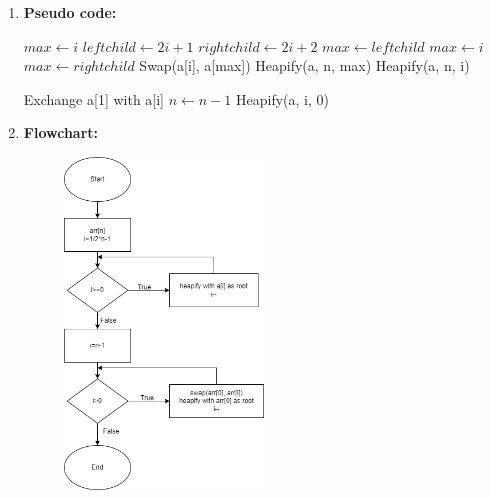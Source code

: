 \documentclass[11pt,a4paper]{article}
\begin{document}
{\begin{enumerate}[label=\textbf{\arabic*})]
					Heapsort is an in-place sorting method, i.e., no additional memory space is required except for loop and auxiliary variables. The number of these variables is always the same. Therefore the space complexity of heapsort is O(1).
				\\[12pt]
				\item \textbf{Pseudo code:} 
				\begin{algorithm}
            	\begin{algorithmic}[1]
            			\State $max \gets i$
            			\State $leftchild \gets 2i+1$
            			\State $rightchild \gets 2i+2$
            				\State $max \gets leftchild$
            			\Else
            				\State $max \gets i$
            			\EndIf
            				\State $max \gets rightchild$
            			\EndIf
            				\State Swap(a[i], a[max])
            				\State Heapify(a, n, max)
            			\EndIf
            		\EndProcedure
            		\vspace{12pt}
            				Heapify(a, n, i)
            			\EndFor
            			
            				\State Exchange a[1] with a[i]
            				\State $n \gets n - 1$
            				\State Heapify(a, i, 0)
            			\EndFor
            		\EndProcedure
            	\end{algorithmic}
            \end{algorithm}
				\item \textbf{Flowchart:}
					\begin{figure}[H]
						\centering 
						\includegraphics[width=0.5\textwidth]{HeapSort Flowchart}
					\end{figure}
					

\end{enumerate}}
\end{document}

